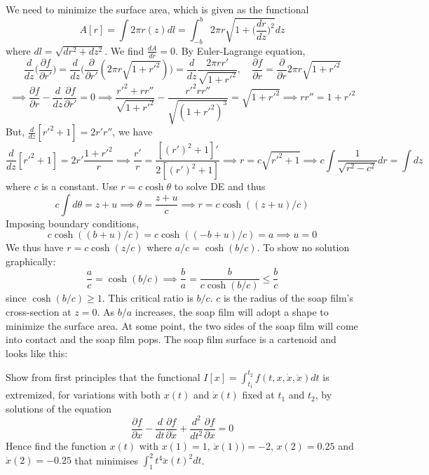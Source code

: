 \documentclass[a4paper]{article}
\begin{document}
\begin{ans}
We need to minimize the surface area, which is given as the functional 
$$A[r]=\int 2\pi r(z)dl=\int_{-b}^b2\pi r\sqrt{1+\bigg(\frac{dr}{dz}\bigg)^2}dz$$
where $dl=\sqrt{dr^2+dz^2}$. We find $\frac{dA}{dr}=0$. By Euler-Lagrange equation, 
$$\frac{d}{dz}\bigg(\frac{\partial f}{\partial r'}\bigg)=\frac{d}{dz}\bigg(\frac{\partial}{\partial r'}(2\pi r\sqrt{1+r'^2})\bigg)=\frac{d}{dz}\frac{2\pi r r'}{\sqrt{1+r'^2}},\quad\frac{\partial f}{\partial r}=\frac{\partial}{\partial r}2\pi r\sqrt{1+r'^2}$$ $$\implies\frac{\partial f}{\partial r}-\frac{d}{dz}\frac{\partial f}{\partial r'}=0\implies\frac{r'^2+rr''}{\sqrt{1+r'^2}}-\frac{r'^2rr''}{\sqrt{(1+r'^2)^3}}=\sqrt{1+r'^2}\implies rr''=1+r'^2$$
But, $\frac{d}{dz}[r'^2+1]=2r'r''$, we have
$$\frac{d}{dz}[r'^2+1]=2r'\frac{1+r'^2}{r}\implies\frac{r'}{r}=\frac{[(r')^2+1]'}{2[(r')^2+1]}\implies r=c\sqrt{r'^2+1}\implies c\int\frac{1}{\sqrt{r^2-c^2}}dr=\int dz$$
where $c$ is a constant. Use $r=c\cosh\theta$ to solve DE and thus $$c\int d\theta=z+u\implies\theta=\frac{z+u}{c}\implies r=c\cosh((z+u)/c)$$ Imposing boundary conditions,
$$c\cosh((b+u)/c)=c\cosh((-b+u)/c)=a\implies u=0$$
We thus have $r=c\cosh(z/c)$ where $a/c=\cosh(b/c)$. To show no solution graphically:
$$\frac{a}{c}=\cosh(b/c)\implies\frac{b}{a}=\frac{b}{c\cosh(b/c)}\leq\frac{b}{c}$$
since $\cosh(b/c)\geq1$. This critical ratio is $b/c$. $c$ is the radius of the soap film's cross-section at $z=0$. As $b/a$ increases, the soap film will adopt a shape to minimize the surface area. At some point, the two sides of the soap film will come into contact and the soap film pops. The soap film surface is a cartenoid and looks like this:
\begin{center}
\end{center}
\end{ans}
\begin{qns}
Show from first principles that the functional $I[x]=\int_{t_1}^{t_2}f(t,x,\dot{x},\ddot{x})dt$ is extremized, for variations with both $x(t)$ and $\dot{x}(t)$ fixed at $t_1$ and $t_2$, by solutions of the equation
$$\frac{\partial f}{\partial x}-\frac{d}{dt}\frac{\partial f}{\partial\dot{x}}+\frac{d^2}{dt^2}\frac{\partial f}{\partial\ddot{x}}=0$$
Hence find the function $x(t)$ with $x(1) = 1$, $\dot{x}(1))=-2$,  $x(2)=0.25$ and $\dot{x}(2)=-0.25$ that minimises $\int_1^2t^4\ddot{x}(t)^2dt$.
\end{qns}
\end{document}
